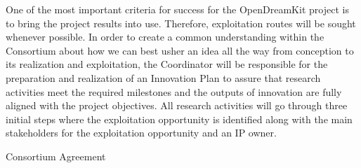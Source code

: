 \begin{workpackage}
\begin{tasklist}
\begin{task}[title=Innovation management,wphases=6-48!.2,
id=project-innovation-management,lead=PS,PM=10,
partners={LL,UV,UJF,UB,UO,USH,USO,SA,UW,JU,UK,US,ZH,SR}]
One of the most important criteria for success for the OpenDreamKit project is to bring the project results into use. Therefore, exploitation routes will be sought whenever possible. In
order to create a common understanding within the Consortium about how we can best usher
an idea all the way from conception to its realization and exploitation, the Coordinator will be responsible for
the preparation and realization of an Innovation Plan to assure that research activities meet the
required milestones and the outputs of innovation are fully aligned with the project objectives.
All research activities will go through three initial steps where the exploitation opportunity is
identified along with the main stakeholders for the exploitation opportunity and an IP owner.
\end{task}
\end{tasklist}

%


\begin{wpdelivs}
\begin{wpdeliv}[due=1,id=ca,dissem=CO,nature=R,lead=PS]{Consortium Agreement}
\end{wpdeliv}


\end{wpdelivs}
\end{workpackage}
